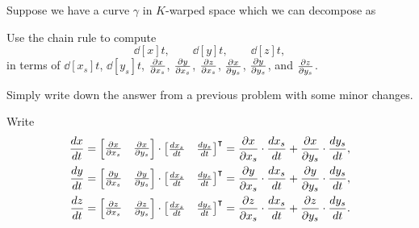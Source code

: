 \documentclass[newpage,hints,handout]{ximera}
\begin{document}
\begin{problem}
Suppose we have a curve $\gamma$ in $K$-warped space which we can decompose as
\begin{image}
\end{image}
Use the chain rule to compute
\[
\dd[x]{t}, \qquad \dd[y]{t}, \qquad \dd[z]{t},
\]
in terms of $\dd[x_s]{t}$, $\dd[y_s]{t}$, $\pp[x]{x_s}$,
$\pp[y]{x_s}$, $\pp[z]{x_s}$, $\pp[x]{y_s}$, $\pp[y]{y_s}$,
and $\pp[z]{y_s}$.
  \begin{hint}
  Simply write down the answer from a previous problem with some minor changes.
  \end{hint}
  \begin{freeResponse}
  Write
  \begin{align*}
    \dd[x]{t} &= \begin{bmatrix}\pp[x]{x_s} & \pp[x]{y_s}\end{bmatrix}\cdot\begin{bmatrix}\dd[x_s]{t} & \dd[y_s]{t}\end{bmatrix}^\transpose = \pp[x]{x_s}\cdot\dd[x_s]{t}+\pp[x]{y_s}\cdot\dd[y_s]{t},   \\
    \dd[y]{t} &= \begin{bmatrix}\pp[y]{x_s} & \pp[y]{y_s}\end{bmatrix}\cdot\begin{bmatrix}\dd[x_s]{t} & \dd[y_s]{t}\end{bmatrix}^\transpose = \pp[y]{x_s}\cdot\dd[x_s]{t}+\pp[y]{y_s}\cdot\dd[y_s]{t},   \\
    \dd[z]{t} &= \begin{bmatrix}\pp[z]{x_s} & \pp[z]{y_s}\end{bmatrix}\cdot\begin{bmatrix}\dd[x_s]{t} & \dd[y_s]{t}\end{bmatrix}^\transpose = \pp[z]{x_s}\cdot\dd[x_s]{t}+\pp[z]{y_s}\cdot\dd[y_s]{t}.  
  \end{align*}
\end{freeResponse}
\end{problem}
\end{document}
